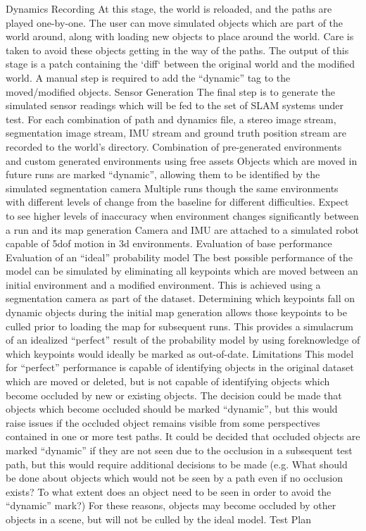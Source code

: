 \documentclass[12pt]{article}
\begin{document}
Dynamics Recording
At this stage, the world is reloaded, and the paths are played one-by-one. The user can move simulated objects which are part of the world around, along with loading new objects to place around the world. Care is taken to avoid these objects getting in the way of the paths. The output of this stage is a patch containing the `diff` between the original world and the modified world. A manual step is required to add the “dynamic” tag to the moved/modified objects.
Sensor Generation
The final step is to generate the simulated sensor readings which will be fed to the set of SLAM systems under test. For each combination of path and dynamics file, a stereo image stream, segmentation image stream, IMU stream and ground truth position stream are recorded to the world’s directory.
Combination of pre-generated environments and custom generated environments using free assets
Objects which are moved in future runs are marked “dynamic”, allowing them to be identified by the simulated segmentation camera
Multiple runs though the same environments with different levels of change from the baseline for different difficulties. Expect to see higher levels of inaccuracy when environment changes significantly between a run and its map generation
Camera and IMU are attached to a simulated robot capable of 5dof motion in 3d environments.
Evaluation of base performance
Evaluation of an “ideal” probability model
The best possible performance of the model can be simulated by eliminating all keypoints which are moved between an initial environment and a modified environment. This is achieved using a segmentation camera as part of the dataset. Determining which keypoints fall on dynamic objects during the initial map generation allows those keypoints to be culled prior to loading the map for subsequent runs. This provides a simulacrum of an idealized “perfect” result of the probability model by using foreknowledge of which keypoints would ideally be marked as out-of-date.
Limitations
This model for “perfect” performance is capable of identifying objects in the original dataset which are moved or deleted, but is not capable of identifying objects which become occluded by new or existing objects. The decision could be made that objects which become occluded should be marked “dynamic”, but this would raise issues if the occluded object remains visible from some perspectives contained in one or more test paths. It could be decided that occluded objects are marked “dynamic” if they are not seen due to the occlusion in a subsequent test path, but this would require additional decisions to be made (e.g. What should be done about objects which would not be seen by a path even if no occlusion exists? To what extent does an object need to be seen in order to avoid the “dynamic” mark?) For these reasons, objects may become occluded by other objects in a scene, but will not be culled by the ideal model.
Test Plan
\end{document}
